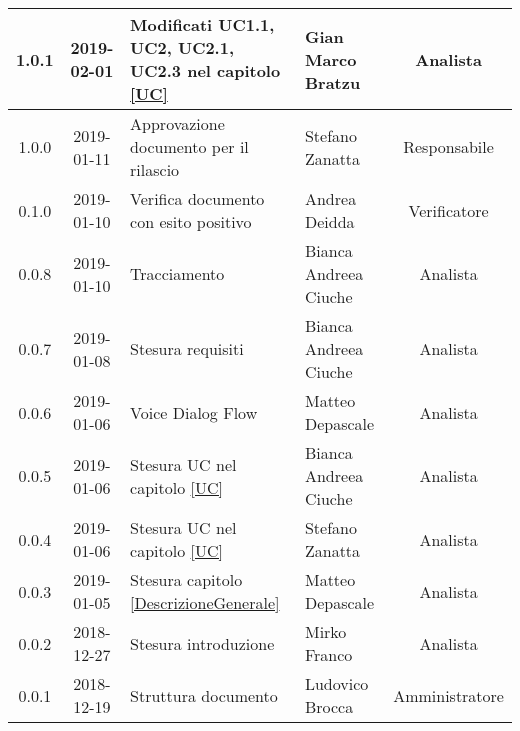 \begin{center}
\begin{tabularx}{\textwidth}{|c|c|X|X|c|}
			\hline
			1.0.1 & 2019-02-01 & Modificati UC1.1, UC2, UC2.1, UC2.3 nel capitolo \cref{UC}& Gian Marco Bratzu & Analista\\
			\hline
			1.0.0 & 2019-01-11 & Approvazione documento per il rilascio& Stefano Zanatta & Responsabile\\
			\hline
			0.1.0 & 2019-01-10 & Verifica documento con esito positivo& Andrea Deidda & Verificatore\\
			\hline
			0.0.8 & 2019-01-10 & Tracciamento& Bianca Andreea Ciuche& Analista\\
			\hline
			0.0.7 & 2019-01-08 & Stesura requisiti & Bianca Andreea Ciuche& Analista\\
			\hline
			0.0.6 & 2019-01-06 & Voice Dialog Flow & Matteo Depascale & Analista\\
			\hline
			0.0.5 & 2019-01-06 & Stesura UC nel capitolo \cref{UC}& Bianca Andreea Ciuche & Analista\\
			\hline
			0.0.4 & 2019-01-06 & Stesura UC nel capitolo \cref{UC}& Stefano Zanatta & Analista\\
			\hline
			0.0.3 & 2019-01-05 & Stesura capitolo \cref{DescrizioneGenerale}& Matteo Depascale & Analista\\
			\hline
			0.0.2 & 2018-12-27 & Stesura introduzione & Mirko Franco & Analista\\
			\hline
			0.0.1 & 2018-12-19 & Struttura documento & Ludovico Brocca & Amministratore\\
			\hline
		\end{tabularx}
	\end{center}
\newpage